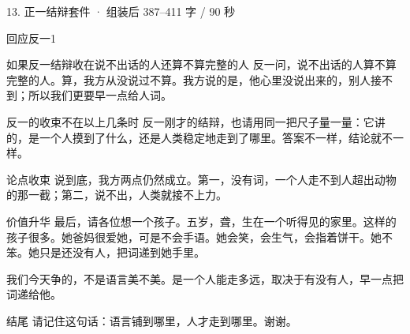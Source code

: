 \documentclass[script,pro]{debate}
\begin{document}
\begin{kit}{13. 正一结辩}{套件 · 组装后 387–411 字 / 90 秒}
\begin{pick}{回应反一}{1}
\begin{module}{如果反一结辩收在说不出话的人还算不算完整的人}
反一问，说不出话的人算不算完整的人。算，我方从没说过不算。我方说的是，他心里没说出来的，别人接不到；所以我们更要早一点给人词。
\end{module}
\begin{fallback}{反一的收束不在以上几条时}
反一刚才的结辩，也请用同一把尺子量一量：它讲的，是一个人摸到了什么，还是人类稳定地走到了哪里。答案不一样，结论就不一样。
\end{fallback}
\end{pick}
\begin{fixed}{论点收束}
说到底，我方两点仍然成立。第一，没有词，一个人走不到人超出动物的那一截；第二，说不出，人类就接不上力。
\end{fixed}
\begin{fixed}{价值升华}
最后，请各位想一个孩子。五岁，聋，生在一个听得见的家里。这样的孩子很多。她爸妈很爱她，可是不会手语。她会笑，会生气，会指着饼干。她不笨。她只是还没有人，把词递到她手里。

我们今天争的，不是语言美不美。是一个人能走多远，取决于有没有人，早一点把词递给他。
\end{fixed}
\begin{fixed}{结尾}
请记住这句话：语言铺到哪里，人才走到哪里。谢谢。
\end{fixed}
\end{kit}
\begin{contingency}
\end{contingency}
\end{document}
